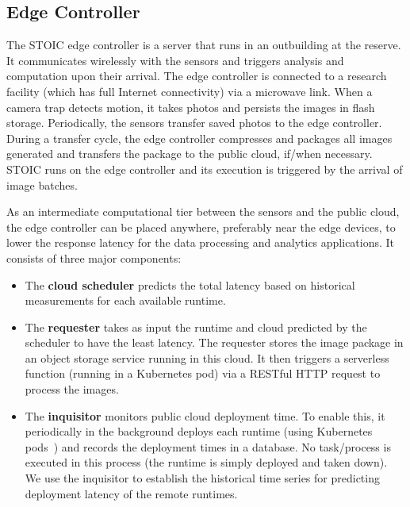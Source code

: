 \subsection{Edge Controller} 

The STOIC edge controller is a server that runs in an
outbuilding at the reserve. It communicates wirelessly with the sensors and triggers analysis and computation upon their arrival. The edge controller is connected to a research facility (which has full Internet connectivity) 
via a microwave link. When a camera trap detects motion, it takes photos and persists the images in flash storage. Periodically, the sensors transfer saved photos to the edge controller. During a transfer cycle, the edge controller compresses and packages all images generated and transfers the package to the public cloud, if/when necessary. STOIC runs on the edge controller and its execution is triggered by the arrival of image batches. 

As an intermediate computational tier between the sensors and the public cloud, the edge controller can be placed anywhere, preferably near the edge devices, to lower the response latency for the data processing and analytics applications. It consists of three major components: 
\begin{itemize}
\item The \textbf{cloud scheduler} predicts the total latency based on historical measurements for each available runtime. 
\item The \textbf{requester} takes as input the runtime and cloud predicted by the scheduler to have the least latency.  The requester stores the image package in an object storage service running in this cloud. It then triggers a serverless function (running in a Kubernetes pod) via a RESTful HTTP request to process the images.
\item The \textbf{inquisitor} monitors public cloud deployment time. To enable this, it periodically in the background deploys each runtime (using Kubernetes pods~\cite{ref:pods}) and records the deployment times in a database. No task/process is executed in this process (the runtime is simply deployed and taken down). We use the inquisitor to establish the historical time series for predicting deployment latency of the remote runtimes.
\end{itemize}

